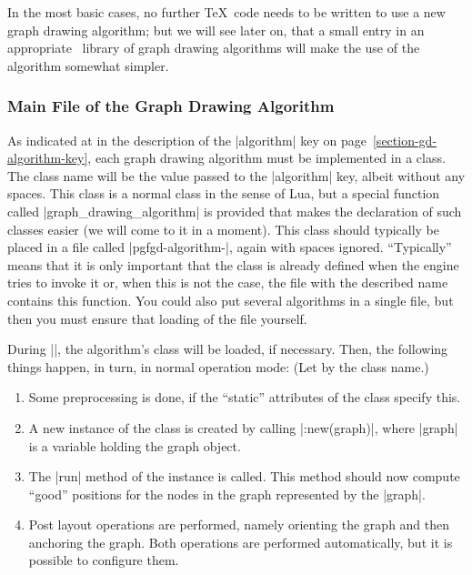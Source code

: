 In the most basic cases, no further \TeX\ code needs to be written to
use a new graph drawing algorithm; but we will see later on, that a
small entry in an appropriate \pgfname\ library of graph drawing
algorithms will make the use of the algorithm somewhat simpler.\


\subsubsection{Main File of the Graph Drawing Algorithm}

As indicated at in the description of the |algorithm| key on
page~\ref{section-gd-algorithm-key}, each graph drawing algorithm  
must be implemented in a class. The class name will be the value
passed to the |algorithm| key, albeit without any spaces. This class
is a normal class in the sense of Lua, but a special function called
|graph_drawing_algorithm| is provided that makes the declaration of
such classes easier (we will come to it in a moment). This class
should typically be placed in a file called
|pgfgd-algorithm-|, again with spaces
ignored. ``Typically'' means that it is only 
important that the class is already defined when the engine
tries to invoke it or, when this is not the case, the file with the
described name contains this function. You could also put several
algorithms in a single file, but then you must ensure that loading of
the file yourself.

During |\pgfgdendscope|, the algorithm's class will be loaded, if
necessary. Then, the following things happen, in turn, in normal
operation mode: (Let  by the class name.)

\begin{enumerate}
\item Some preprocessing is done, if the ``static'' attributes of the
  class specify this.
\item A new instance of the class is created by calling
  |:new(graph)|, where |graph| is a variable holding the
  graph object. 
\item The |run| method of the instance is called. This method should now
  compute ``good'' positions for the nodes in the graph represented by
  the |graph|.
\item Post layout operations are performed, namely orienting the
  graph and then anchoring the graph. Both operations are performed
  automatically, but it is possible to configure them.
\end{enumerate}

